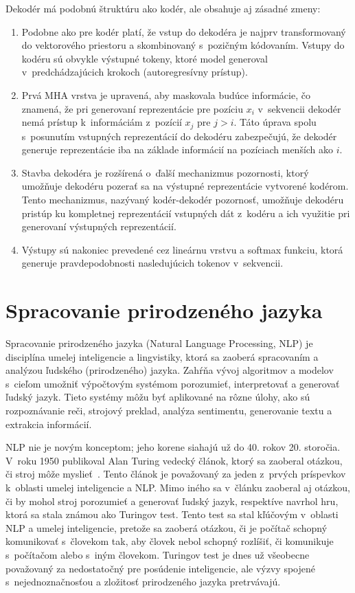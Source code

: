 \noindent Dekodér má podobnú štruktúru ako kodér, ale obsahuje aj zásadné zmeny:
\begin{enumerate}
    \item Podobne ako pre kodér platí, že vstup do dekodéra je najprv transformovaný do vektorového priestoru a skombinovaný s~pozičným kódovaním. Vstupy do kodéru sú obvykle výstupné tokeny, ktoré model generoval v~predchádzajúcich krokoch (autoregresívny prístup).

    \item Prvá MHA vrstva je upravená, aby maskovala budúce informácie, čo znamená, že pri generovaní reprezentácie pre pozíciu $x_i$ v~sekvencii dekodér nemá prístup k~informáciám z~pozícií $x_j$ pre $j > i$. Táto úprava spolu s~posunutím vstupných reprezentácií do dekodéru zabezpečujú, že dekodér generuje reprezentácie iba na základe informácií na pozíciach menších ako $i$.

    \item Stavba dekodéra je rozšírená o~ďalší mechanizmus pozornosti, ktorý umožňuje dekodéru pozerať sa na výstupné reprezentácie vytvorené kodérom. Tento mechanizmus, nazývaný kodér-dekodér pozornosť, umožňuje dekodéru pristúp ku kompletnej reprezentácií vstupných dát z~kodéru a ich využitie pri generovaní výstupných reprezentácií.

    \item Výstupy sú nakoniec prevedené cez lineárnu vrstvu a softmax funkciu, ktorá generuje pravdepodobnosti nasledujúcich tokenov v~sekvencii.
\end{enumerate}


\chapter{Spracovanie prirodzeného jazyka}\label{chap:nlp}

Spracovanie prirodzeného jazyka (Natural Language Processing, NLP) je disciplína umelej inteligencie a lingvistiky, ktorá sa zaoberá spracovaním a analýzou ľudského (prirodzeného) jazyka. Zahŕňa vývoj algoritmov a modelov s~cieľom umožniť výpočtovým systémom porozumieť, interpretovať a generovať ľudský jazyk. Tieto systémy môžu byť aplikované na rôzne úlohy, ako sú rozpoznávanie reči, strojový preklad, analýza sentimentu, generovanie textu a extrakcia informácií.

NLP nie je novým konceptom; jeho korene siahajú už do 40. rokov 20. storočia. V~roku 1950 publikoval Alan Turing vedecký článok, ktorý sa zaoberal otázkou, či stroj môže myslieť~\cite{TURING1950}. Tento článok je považovaný za jeden z~prvých príspevkov k~oblasti umelej inteligencie a NLP. Mimo iného sa v~článku zaoberal aj otázkou, či by mohol stroj porozumieť a generovať ľudský jazyk, respektíve navrhol hru, ktorá sa stala známou ako Turingov test. Tento test sa stal kľúčovým v~oblasti NLP a umelej inteligencie, pretože sa zaoberá otázkou, či je počítač schopný komunikovať s~človekom tak, aby človek nebol schopný rozlíšiť, či komunikuje s~počítačom alebo s~iným človekom. Turingov test je dnes už všeobecne považovaný za nedostatočný pre posúdenie inteligencie, ale výzvy spojené s~nejednoznačnosťou a zložitosť prirodzeného jazyka pretrvávajú.

